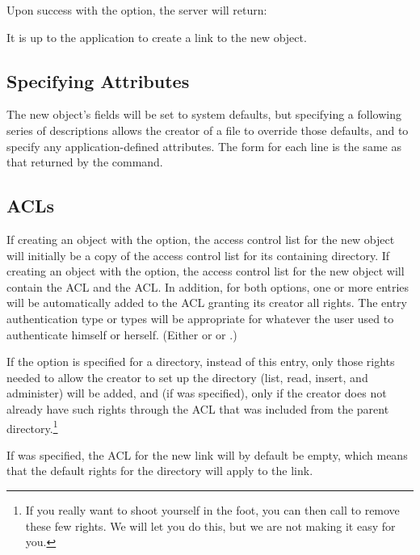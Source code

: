 Upon success with the  option, the server will return:
\begin{command}
  
\end{command}
It is up to the application to create a link to the new object.  

\subsection{Specifying Attributes}

The new object's fields will be set to system defaults, but
specifying a following series of  descriptions allows
the creator of a file to override those defaults, and to specify any
application-defined attributes.  The form for each  line is
the same as that returned by the
 command.

\subsection{ACLs}

If creating an object with the  option, the access
control list for the new object will initially be a copy of the access control
list for its containing directory.  If creating an object with the
 option, the access control list for the new object will
contain the  ACL and the  ACL.
In addition,
for both options, one or more entries will be automatically added to the ACL
granting its creator all rights.  The entry authentication type or types
will be appropriate for whatever the user used to authenticate himself
or herself.  (Either   or  or
.)

If the  option is
specified for a directory, instead of this entry, only those rights needed to 
allow the creator to set up the directory (list, read, insert, and
administer) will be added, and (if  was specified), only
if the creator does not already have such rights through the ACL that
was included from the parent directory.\footnote{If you really want to shoot yourself in the foot, you can
then call  to remove these few rights.  We will let you
do this, but we are not making it easy for you.} 

If  was specified, the ACL for the new link will
by default be empty, which means that the default rights for the
directory will apply to the link.

